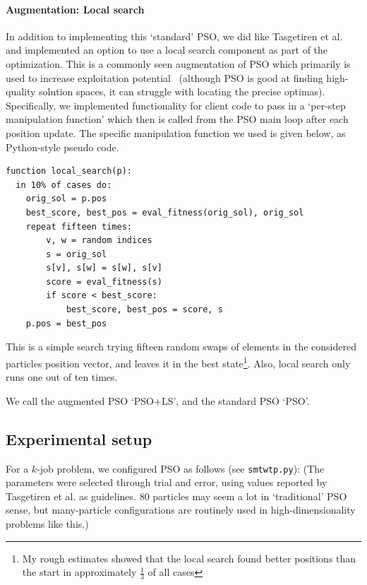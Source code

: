 \documentclass[a4paper,final,9pt]{article}
\begin{document}
\paragraph{Augmentation: Local search}
In addition to implementing this `standard' PSO, we did like Tasgetiren et al.
and implemented an option to use a local search component as part of the
optimization. This is a commonly seen augmentation of
PSO which primarily is used to increase exploitation
potential~\cite{engelbrecht} (although PSO is good at finding high-quality
solution spaces, it can struggle with locating the precise optimas). 
Specifically, we implemented functionality for client code to pass in a
`per-step manipulation function' which then is called from the PSO main loop
after each position update. The specific manipulation function we used is
given below, as Python-style pseudo code.
\begin{verbatim}
function local_search(p):
  in 10% of cases do:
    orig_sol = p.pos
    best_score, best_pos = eval_fitness(orig_sol), orig_sol
    repeat fifteen times:
        v, w = random indices
        s = orig_sol
        s[v], s[w] = s[w], s[v]
        score = eval_fitness(s)
        if score < best_score:
            best_score, best_pos = score, s
    p.pos = best_pos
\end{verbatim}
This is a simple search trying fifteen random swaps of elements in the
considered particles position vector, and leaves it in the best
state\footnote{My rough estimates showed that the local search found better
positions than the start in approximately $\frac{1}{3}$ of all cases}. Also,
local search only runs one out of ten times.

We call the augmented PSO `PSO+LS', and the standard PSO `PSO'.


\subsection{Experimental setup}
For a $k$-job problem, we configured PSO as follows (see \texttt{smtwtp.py}):
(The parameters were selected through trial and error, using values reported
by Tasgetiren et al. as guidelines. 80 particles may seem a lot in
`traditional' PSO sense, but many-particle configurations are routinely used
in high-dimensionality problems like this.)
\end{document}
